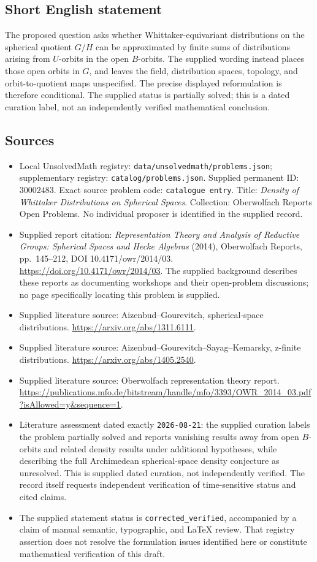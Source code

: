 \documentclass[11pt]{article}
\begin{document}
\subsection{Short English statement}
The proposed question asks whether Whittaker-equivariant distributions on the spherical quotient \(G/H\) can be approximated by finite sums of distributions arising from \(U\)-orbits in the open \(B\)-orbits. The supplied wording instead places those open orbits in \(G\), and leaves the field, distribution spaces, topology, and orbit-to-quotient maps unspecified. The precise displayed reformulation is therefore conditional. The supplied status is partially solved; this is a dated curation label, not an independently verified mathematical conclusion.
\subsection{Sources}
\begin{itemize}
\item Local UnsolvedMath registry: \texttt{data/unsolvedmath/problems.json}; supplementary registry: \texttt{catalog/problems.json}. Supplied permanent ID: \(30002483\). Exact source problem code: \texttt{catalogue entry}. Title: \emph{Density of Whittaker Distributions on Spherical Spaces}. Collection: Oberwolfach Reports Open Problems. No individual proposer is identified in the supplied record.
\item Supplied report citation: \emph{Representation Theory and Analysis of Reductive Groups: Spherical Spaces and Hecke Algebras} (2014), Oberwolfach Reports, pp.\ 145--212, DOI 10.4171/owr/2014/03. \url{https://doi.org/10.4171/owr/2014/03}. The supplied background describes these reports as documenting workshops and their open-problem discussions; no page specifically locating this problem is supplied.
\item Supplied literature source: Aizenbud--Gourevitch, spherical-space distributions. \url{https://arxiv.org/abs/1311.6111}.
\item Supplied literature source: Aizenbud--Gourevitch--Sayag--Kemarsky, z-finite distributions. \url{https://arxiv.org/abs/1405.2540}.
\item Supplied literature source: Oberwolfach representation theory report. \url{https://publications.mfo.de/bitstream/handle/mfo/3393/OWR_2014_03.pdf?isAllowed=y&sequence=1}.
\item Literature assessment dated exactly \texttt{2026-08-21}: the supplied curation labels the problem partially solved and reports vanishing results away from open \(B\)-orbits and related density results under additional hypotheses, while describing the full Archimedean spherical-space density conjecture as unresolved. This is supplied dated curation, not independently verified. The record itself requests independent verification of time-sensitive status and cited claims.
\item The supplied statement status is \texttt{corrected\_verified}, accompanied by a claim of manual semantic, typographic, and LaTeX review. That registry assertion does not resolve the formulation issues identified here or constitute mathematical verification of this draft.
\end{itemize}
\end{document}
